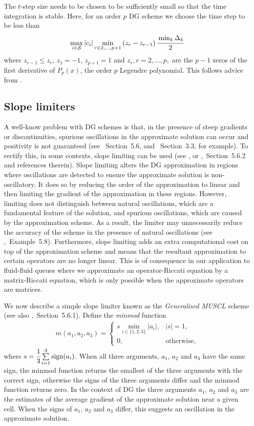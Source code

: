 The \(t\)-step size needs to be chosen to be sufficiently small so that the time integration is stable. Here, for an order \(p\) DG scheme we choose the time step to be less than 
\[\max_{i\in\mathcal{S}}|c_i|\min_{r\in{2,...,p+1}}\left(z_{r}-z_{r-1}\right) \cfrac{\min_{k}{\Delta}_k}{2}\]
where \(z_{r-1}\leq z_r\), \(z_1=-1\), \(z_{p+1}=1\) and \(z_r, r=2,...,p,\) are the \(p-1\) zeros of the first derivative of \(P_{p}(x)\), the order \(p\) Legendre polynomial. This follows advice from \cite{nodalDGBook}. 

\subsection{Slope limiters}\label{sec: slope limiting}
A well-know problem with DG schemes is that, in the presence of steep gradients or discontinuities, spurious oscillations in the approximate solution can occur and positivity is not guaranteed (see \cite{nodalDGBook}~Section~5.6, and \cite{koltai2011}~Section~3.3, for example). To rectify this, in some contexts, slope limiting can be used (see \cite{c99}, or \cite{nodalDGBook},~Section~5.6.2 and references therein). Slope limiting alters the DG approximation in regions where oscillations are detected to ensure the approximate solution is non-oscillatory. It does so by reducing the order of the approximation to linear and then limiting the gradient of the approximation in these regions. However, limiting does not distinguish between natural oscillations, which are a fundamental feature of the solution, and spurious oscillations, which are caused by the approximation scheme. As a result, the limiter may unnecessarily reduce the accuracy of the scheme in the presence of natural oscillations (see \citep{nodalDGBook},~Example~5.8). Furthermore, slope limiting adds an extra computational cost on top of the approximation scheme and means that the resultant approximation to certain operators are no longer linear. This is of consequence in our application to fluid-fluid queues where we approximate an operator-Riccati equation by a matrix-Riccati equation, which is only possible when the approximate operators are matrices. 

We now describe a simple slope limiter known as the \emph{Generalised MUSCL} scheme \citep{c99} (see also \citep{nodalDGBook},~Section~5.6.1). Define the \emph{minmod} function 
\begin{align*}
	m(a_1,a_2,a_3)=\begin{cases}
		s\min_{i\in\{1,2,3\}}|a_i|, & |s|=1, \\
		0, &\mbox{otherwise},
	\end{cases}
\end{align*}
where \(s=\cfrac{1}{3}\sum\limits_{i=1}^{3}\mbox{sign}(a_i)\). When all three arguments, \(a_1,\,a_2\) and \(a_3\) have the same sign, the minmod function returns the smallest of the three arguments with the correct sign, otherwise the signs of the three arguments differ and the minmod function returns zero. In the context of DG the three arguments \(a_1,\,a_2\) and \(a_3\) are the estimates of the average gradient of the approximate solution near a given cell. When the signs of \(a_1,\,a_2\) and \(a_3\) differ, this suggests an oscillation in the approximate solution. 

